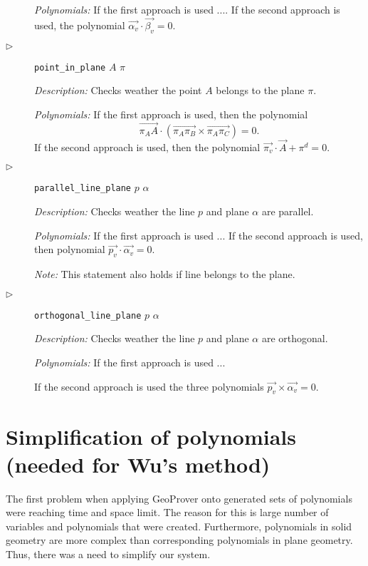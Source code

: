 \documentclass{aicom2e}
\begin{document}
\begin{description}
{\em Polynomials:} 
If the first approach is used ....
If the second approach is used, the polynomial
$\overrightarrow{\alpha_v} \cdot \overrightarrow{\beta_v} = 0$.

\item[$\triangleright$] {\tt point\_in\_plane} $A$ $\pi$

{\em Description:} Checks weather the point $A$ belongs to the plane
$\pi$.

{\em Polynomials:} If the first approach is used, then the polynomial
$$\overrightarrow{\pi_AA}\cdot (\overrightarrow{\pi_A\pi_B} \times \overrightarrow{\pi_A\pi_C}) = 0.$$
If the second approach is used, then the polynomial
$\overrightarrow{\pi_v} \cdot \overrightarrow{A} + \pi^{d} = 0$.

\item[$\triangleright$] {\tt parallel\_line\_plane} $p$ $\alpha$

{\em Description:} Checks weather the line $p$ and plane $\alpha$ are
parallel.

{\em Polynomials:} 
If the first approach is used ...
If the second approach is used, then polynomial
$\overrightarrow{p_v} \cdot \overrightarrow{\alpha_v} = 0$.

{\em Note:} This statement also holds if line belongs to the plane.

\item[$\triangleright$] {\tt orthogonal\_line\_plane} $p$ $\alpha$

{\em Description:} Checks weather the line $p$ and plane $\alpha$ are
orthogonal.

{\em Polynomials:} If the first approach is used ...

If the second approach is used the three polynomials
$\overrightarrow{p_v} \times \overrightarrow{\alpha_v} = 0$.

\end{description}

\section{Simplification of polynomials (needed for Wu's method)}
\label{simplification}

The first problem when applying GeoProver onto generated sets of
polynomials were reaching time and space limit. The reason for this is
large number of variables and polynomials that were
created. Furthermore, polynomials in solid geometry are more complex
than corresponding polynomials in plane geometry. Thus, there was a
need to simplify our system.
\end{document}
